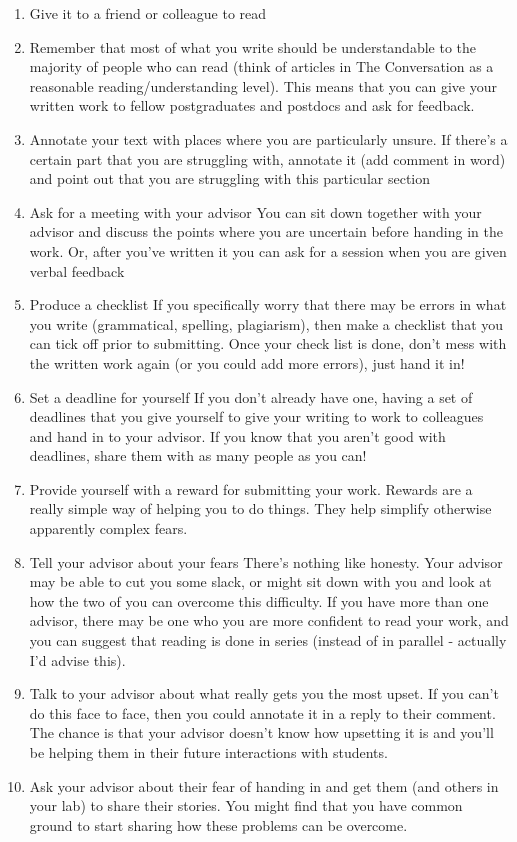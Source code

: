 \documentclass[
]{krantz}
\providecommand{\tightlist}{%
  \setlength{\itemsep}{0pt}\setlength{\parskip}{0pt}}
\begin{document}
\begin{enumerate}
\def\labelenumi{\arabic{enumi}.}
\tightlist
\item
  Give it to a friend or colleague to read
\item
  Remember that most of what you write should be understandable to the majority of people who can read (think of articles in The Conversation as a reasonable reading/understanding level). This means that you can give your written work to fellow postgraduates and postdocs and ask for feedback.
\item
  Annotate your text with places where you are particularly unsure.
  If there's a certain part that you are struggling with, annotate it (add comment in word) and point out that you are struggling with this particular section
\item
  Ask for a meeting with your advisor
  You can sit down together with your advisor and discuss the points where you are uncertain before handing in the work. Or, after you've written it you can ask for a session when you are given verbal feedback
\item
  Produce a checklist
  If you specifically worry that there may be errors in what you write (grammatical, spelling, plagiarism), then make a checklist that you can tick off prior to submitting. Once your check list is done, don't mess with the written work again (or you could add more errors), just hand it in!
\item
  Set a deadline for yourself
  If you don't already have one, having a set of deadlines that you give yourself to give your writing to work to colleagues and hand in to your advisor. If you know that you aren't good with deadlines, share them with as many people as you can!
\item
  Provide yourself with a reward for submitting your work. Rewards are a really simple way of helping you to do things. They help simplify otherwise apparently complex fears.
\item
  Tell your advisor about your fears
  There's nothing like honesty. Your advisor may be able to cut you some slack, or might sit down with you and look at how the two of you can overcome this difficulty.
  If you have more than one advisor, there may be one who you are more confident to read your work, and you can suggest that reading is done in series (instead of in parallel - actually I'd advise this).
\item
  Talk to your advisor about what really gets you the most upset. If you can't do this face to face, then you could annotate it in a reply to their comment. The chance is that your advisor doesn't know how upsetting it is and you'll be helping them in their future interactions with students.
\item
  Ask your advisor about their fear of handing in and get them (and others in your lab) to share their stories. You might find that you have common ground to start sharing how these problems can be overcome.
\end{enumerate}
\end{document}
